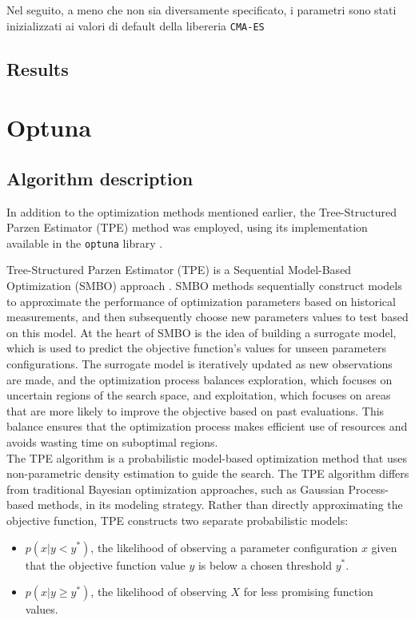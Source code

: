 Nel seguito, a meno che non sia diversamente specificato, i parametri sono stati inizializzati ai valori di default della libereria \tt{CMA-ES}
\subsection{Results}


\section{Optuna}

\subsection{Algorithm description}

In addition to the optimization methods mentioned earlier, the Tree-Structured Parzen Estimator (TPE) method was employed, using its implementation available in the \texttt{optuna} library \cite{optuna_2019}.

Tree-Structured Parzen Estimator (TPE) is a Sequential Model-Based Optimization (SMBO) approach \cite{SMBO_proceedings}. 
SMBO methods sequentially construct models to approximate the performance of optimization parameters based on historical measurements, and then subsequently choose new parameters values to test based on this model. \cite{BayesianOptimizationReview}
At the heart of SMBO is the idea of building a surrogate model, which is used to predict the objective function's values for unseen parameters configurations. 
The surrogate model is iteratively updated as new observations are made, and the optimization process balances exploration, which focuses on uncertain regions of the search space, and exploitation, which focuses on areas that are more likely to improve the objective based on past evaluations. 
This balance ensures that the optimization process makes efficient use of resources and avoids wasting time on suboptimal regions.\\

The TPE algorithm is a probabilistic model-based optimization method that uses non-parametric density estimation to guide the search. 
The TPE algorithm differs from traditional Bayesian optimization approaches, such as Gaussian Process-based methods, in its modeling strategy. 
Rather than directly approximating the objective function, TPE constructs two separate probabilistic models:

\begin{itemize}
    \item $p(x | y < y^*)$, the likelihood of observing a parameter configuration $x$ given that the objective function value $y$ is below a chosen threshold $y^*$.
    \item $p(x | y \geq y^*)$, the likelihood of observing $X$ for less promising function values.
\end{itemize}

